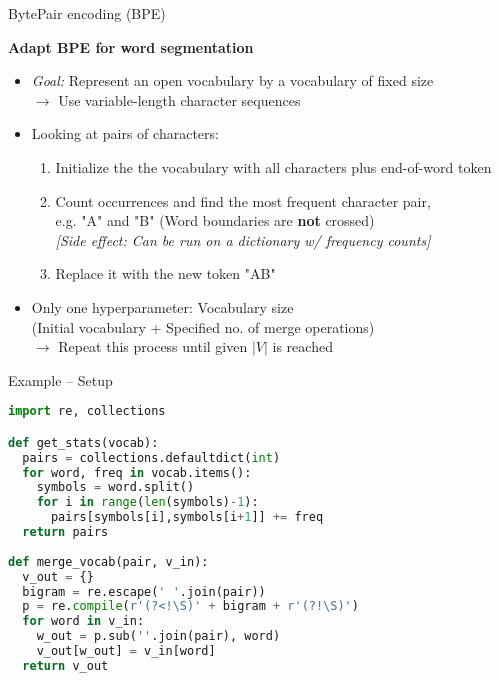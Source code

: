 \begin{vbframe}{BytePair encoding (BPE)}

\vfill

\textbf{Adapt BPE for word segmentation \href{https://www.aclweb.org/anthology/P16-1162.pdf}{}}

	\begin{itemize}
		\item \textit{Goal:} Represent an open vocabulary by a vocabulary of fixed size\\
					$\rightarrow$ Use variable-length character sequences 
		\item Looking at pairs of characters:
			\begin{enumerate}
				\item Initialize the the vocabulary with all characters plus end-of-word token
				\item Count occurrences and find the most frequent character pair,\\
							e.g. "A" and "B" (\warning Word boundaries are \textbf{not} crossed) \\
							\textit{[Side effect: Can be run on a dictionary w/ frequency counts]}
				\item Replace it with the new token "AB"
			\end{enumerate}
		\item Only one hyperparameter: Vocabulary size\\
					(Initial vocabulary + Specified no. of merge operations)\\
					$\rightarrow$ Repeat this process until given $|V|$ is reached
	\end{itemize}

\vfill

\end{vbframe}


\begin{vbframe}{Example -- Setup \href{https://www.aclweb.org/anthology/P16-1162.pdf}{}}

\begin{lstlisting}[language=Python]
import re, collections

def get_stats(vocab):
  pairs = collections.defaultdict(int)
  for word, freq in vocab.items():
    symbols = word.split()
    for i in range(len(symbols)-1):
      pairs[symbols[i],symbols[i+1]] += freq
  return pairs
	
def merge_vocab(pair, v_in):
  v_out = {}
  bigram = re.escape(' '.join(pair))
  p = re.compile(r'(?<!\S)' + bigram + r'(?!\S)')
  for word in v_in:
    w_out = p.sub(''.join(pair), word)
    v_out[w_out] = v_in[word]
  return v_out
\end{lstlisting}

\end{vbframe}

